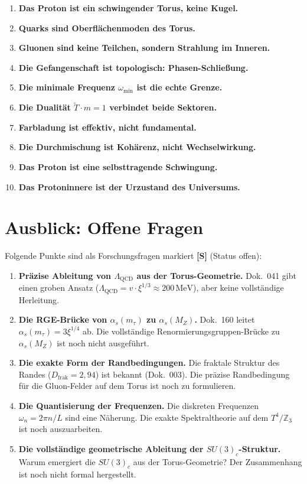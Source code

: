 \documentclass[11pt,a4paper]{article}
\begin{document}
	\begin{enumerate}
		\item \textbf{Das Proton ist ein schwingender Torus, keine Kugel.}
		\item \textbf{Quarks sind Oberflächenmoden des Torus.}
		\item \textbf{Gluonen sind keine Teilchen, sondern Strahlung im Inneren.}
		\item \textbf{Die Gefangenschaft ist topologisch: Phasen-Schließung.}
		\item \textbf{Die minimale Frequenz \(\omega_{\min}\) ist die echte Grenze.}
		\item \textbf{Die Dualität \(\tilde{T}\cdot m = 1\) verbindet beide Sektoren.}
		\item \textbf{Farbladung ist effektiv, nicht fundamental.}
		\item \textbf{Die Durchmischung ist Kohärenz, nicht Wechselwirkung.}
		\item \textbf{Das Proton ist eine selbsttragende Schwingung.}
		\item \textbf{Das Protoninnere ist der Urzustand des Universums.}
	\end{enumerate}
	
	\section{Ausblick: Offene Fragen}
	
	Folgende Punkte sind als Forschungsfragen markiert \textbf{[S]} (Status offen):
	
	\begin{enumerate}
		\item \textbf{Präzise Ableitung von \(\Lambda_{\text{QCD}}\) aus der Torus-Geometrie.} 
		Dok.~041 gibt einen groben Ansatz (\(\Lambda_{\text{QCD}} = v \cdot \xi^{1/3} \approx 200\,\text{MeV}\)), aber keine vollständige Herleitung.
		
		\item \textbf{Die RGE-Brücke von \(\alpha_s(m_\tau)\) zu \(\alpha_s(M_Z)\).} 
		Dok.~160 leitet \(\alpha_s(m_\tau) = 3\xi^{1/4}\) ab. Die vollständige Renormierungsgruppen-Brücke zu \(\alpha_s(M_Z)\) ist noch nicht ausgeführt.
		
		\item \textbf{Die exakte Form der Randbedingungen.} 
		Die fraktale Struktur des Randes (\(D_{\text{frak}} = 2{,}94\)) ist bekannt (Dok.~003). Die präzise Randbedingung für die Gluon-Felder auf dem Torus ist noch zu formulieren.
		
		\item \textbf{Die Quantisierung der Frequenzen.} 
		Die diskreten Frequenzen \(\omega_n = 2\pi n/L\) sind eine Näherung. Die exakte Spektraltheorie auf dem \(T^4/\mathbb{Z}_3\) ist noch auszuarbeiten.
		
		\item \textbf{Die vollständige geometrische Ableitung der \(SU(3)_c\)-Struktur.} 
		Warum emergiert die \(SU(3)_c\) aus der Torus-Geometrie? Der Zusammenhang ist noch nicht formal hergestellt.
	\end{enumerate}
	
\end{document}
